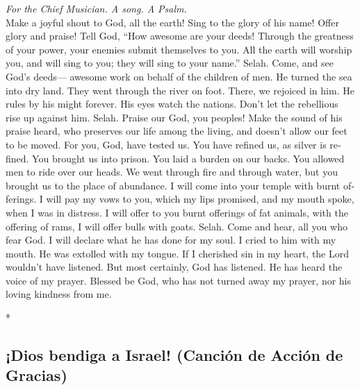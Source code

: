 \begin{paracol}{2}
\begin{otherlanguage}{english}
\emph{For the Chief Musician. A song. A Psalm.}\\
 Make a joyful shout to God, all the earth! 
Sing to the glory of his name! Offer glory and praise! 
Tell God, ``How awesome are your deeds! Through the greatness of your
power, your enemies submit themselves to you.  All the
earth will worship you, and will sing to you; they will sing to your
name.'' Selah.  Come, and see God's deeds--- awesome work
on behalf of the children of men.  He turned the sea into
dry land. They went through the river on foot. There, we rejoiced in
him.  He rules by his might forever. His eyes watch the
nations. Don't let the rebellious rise up against him. Selah.
 Praise our God, you peoples! Make the sound of his praise
heard,  who preserves our life among the living, and
doesn't allow our feet to be moved.  For you, God, have
tested us. You have refined us, as silver is refined. 
You brought us into prison. You laid a burden on our backs.
 You allowed men to ride over our heads. We went through
fire and through water, but you brought us to the place of abundance.
 I will come into your temple with burnt offerings. I
will pay my vows to you,  which my lips promised, and my
mouth spoke, when I was in distress.  I will offer to you
burnt offerings of fat animals, with the offering of rams, I will offer
bulls with goats. Selah.  Come and hear, all you who fear
God. I will declare what he has done for my soul.  I
cried to him with my mouth. He was extolled with my tongue.
 If I cherished sin in my heart, the Lord wouldn't have
listened.  But most certainly, God has listened. He has
heard the voice of my prayer.  Blessed be God, who has
not turned away my prayer, nor his loving kindness from me.

\end{otherlanguage}

\switchcolumn[0]*

\hypertarget{dios-bendiga-a-israel-canciuxf3n-de-acciuxf3n-de-gracias}{%
\subsection{¡Dios bendiga a Israel! (Canción de Acción de
Gracias)}\label{dios-bendiga-a-israel-canciuxf3n-de-acciuxf3n-de-gracias}}


\end{paracol}
